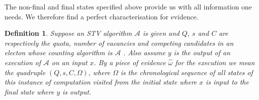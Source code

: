\documentclass[10pt,conference]{IEEEtran}
\newtheorem{definition}{Definition}
\begin{document}
The non-final and final states specified above provide us with all information one needs. We therefore find a perfect characterisation for evidence. 
\begin{definition}\label{formalEv}
Suppose an STV algorithm $\mathcal{A}$ is given and $Q$, $s$ and $C$ are respectively the quota, number of vacancies and competing candidates in an electon whose counting algorithm is $\mathcal{A}$ . Also assume  $y$ is the output of an execution of $\mathcal{A}$ on an input $x$. By a piece of evidence $\hat{\omega}$ for the execution  we mean the quadruple $(Q,s,C,\Omega)$, where $\Omega$ is the chronological sequence of all states of this instance of computation visited from the initial state where $x$ is input to the final state where $y$ is output.   
\end{definition}
\end{document}

